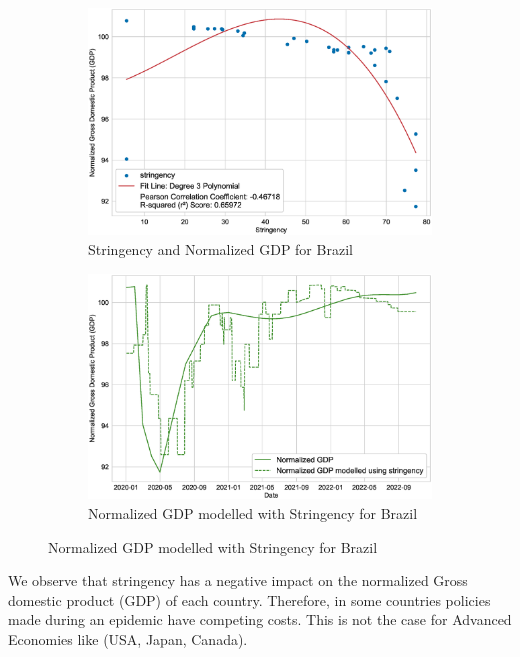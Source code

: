 \documentclass[tikz,fleqn,12pt]{wlscirep}
\begin{document}
\begin{figure}[H]
  \begin{subfigure}[t]{0.48\textwidth}
    \centering
    \includegraphics[width=\linewidth]{images/stringency_vs_gdp_BRA.eps}
    \caption{Stringency and Normalized GDP for Brazil}
  \end{subfigure}
  \label{fig:stringency_vs_gdp_BRA}
  \hfill
  \begin{subfigure}[t]{0.48\textwidth}
    \centering
    \includegraphics[width=\linewidth]{images/gdp_modelled_with_stringency_BRA.eps}
    \caption{Normalized GDP modelled with Stringency for Brazil}
  \end{subfigure}
  \label{fig:gdp_modelled_with_stringency_BRA}
\end{figure}

We observe that stringency has a negative impact on the normalized Gross domestic product (GDP) of each country. Therefore, in some countries policies made during an epidemic have competing costs. This is not the case for Advanced Economies like (USA, Japan, Canada).
\end{document}
